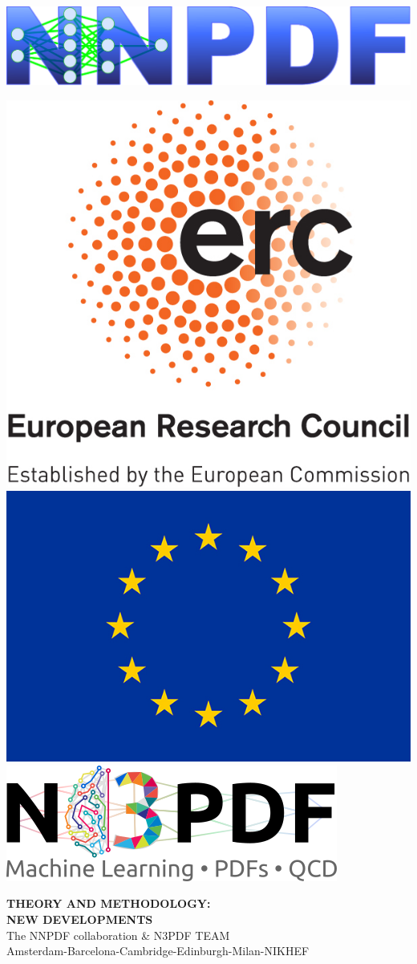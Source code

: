 \documentclass[a4,landscape]{seminar}
\newcommand{\1}{1\!\!\!1}
\begin{document}
\renewcommand{\labelitemii}{\textrm{--}}
%
%


\begin{slide}
  \begin{minipage}{.47\linewidth}
\begin{flushleft}\includegraphics[width=.48\linewidth,clip]{nnpdf_logo_official.pdf}\end{flushleft}
\end{minipage}
\begin{minipage}{.47\linewidth}\begin{flushright}
\includegraphics[width=.16\linewidth,clip]{LOGO-ERC.jpg}
\includegraphics[width=.22\linewidth,clip]{flag_yellow_low.jpg}
\includegraphics[width=.51\linewidth,clip]{n3pdflogo_noback.png}
\end{flushright}\end{minipage}
\renewcommand{\slidestretch}{.8}
\begin{center}
\vspace{.6cm}
 {\bf\huge {\red THEORY AND METHODOLOGY:}}\\
\vspace{.4cm}
 {\bf\huge\darkgreen NEW DEVELOPMENTS}\\
\vspace{1. cm}
{\Large {\blue The NNPDF collaboration \& N3PDF TEAM}\\
 {\small Amsterdam-Barcelona-Cambridge-Edinburgh-Milan-NIKHEF}
}

\end{center}
\end{slide}
\end{document}

